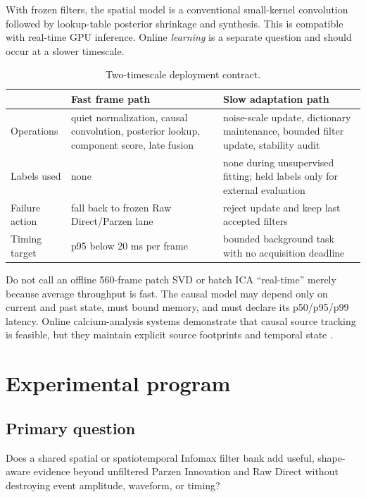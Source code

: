 \documentclass[11pt]{article}
\begin{document}
With frozen filters, the spatial model is a conventional small-kernel
convolution followed by lookup-table posterior shrinkage and synthesis. This is
compatible with real-time GPU inference. Online \emph{learning} is a separate
question and should occur at a slower timescale.

\begin{table}[H]
\centering
\caption{Two-timescale deployment contract.}
\begin{tabularx}{\textwidth}{@{}p{}X X@{}}
\toprule
 & Fast frame path & Slow adaptation path\\
\midrule
Operations &
quiet normalization, causal convolution, posterior lookup, component score,
late fusion &
noise-scale update, dictionary maintenance, bounded filter update,
stability audit\\
Labels used &
none &
none during unsupervised fitting; held labels only for external evaluation\\
Failure action &
fall back to frozen Raw Direct/Parzen lane &
reject update and keep last accepted filters\\
Timing target &
p95 below 20 ms per frame &
bounded background task with no acquisition deadline\\
\bottomrule
\end{tabularx}
\end{table}

Do not call an offline 560-frame patch SVD or batch ICA ``real-time'' merely
because average throughput is fast. The causal model may depend only on current
and past state, must bound memory, and must declare its p50/p95/p99 latency.
Online calcium-analysis systems demonstrate that causal source tracking is
feasible, but they maintain explicit source footprints and temporal state
\cite{giovannucci2017onacid,friedrich2017oasis}.

\section{Experimental program}

\subsection{Primary question}

Does a shared spatial or spatiotemporal Infomax filter bank add useful,
shape-aware evidence beyond unfiltered Parzen Innovation and Raw Direct without
destroying event amplitude, waveform, or timing?
\end{document}
